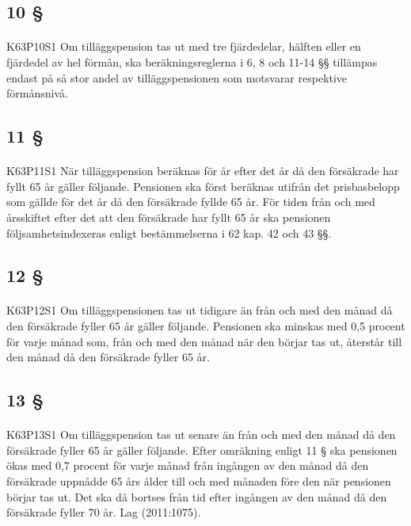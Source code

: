 \documentclass[a4paper,notitlepage,openany,10pt]{book}
\begin{document}
\subsection*{10 §}
\paragraph*{}
{\tiny K63P10S1}
Om tilläggspension tas ut med tre fjärdedelar, hälften eller en fjärdedel av hel förmån, ska beräkningsreglerna i 6, 8 och 11-14 §§ tillämpas endast på så stor andel av tilläggspensionen som motsvarar respektive förmånsnivå.
\subsection*{11 §}
\paragraph*{}
{\tiny K63P11S1}
När tilläggspension beräknas för år efter det år då den försäkrade har fyllt 65 år gäller följande. Pensionen ska först beräknas utifrån det prisbasbelopp som gällde för det år då den försäkrade fyllde 65 år. För tiden från och med årsskiftet efter det att den försäkrade har fyllt 65 år ska pensionen följsamhetsindexeras enligt bestämmelserna i 62 kap. 42 och 43 §§.
\subsection*{12 §}
\paragraph*{}
{\tiny K63P12S1}
Om tilläggspensionen tas ut tidigare än från och med den månad då den försäkrade fyller 65 år gäller följande.
Pensionen ska minskas med 0,5 procent för varje månad som, från och med den månad när den börjar tas ut, återstår till den månad då den försäkrade fyller 65 år.
\subsection*{13 §}
\paragraph*{}
{\tiny K63P13S1}
Om tilläggspension tas ut senare än från och med den månad då den försäkrade fyller 65 år gäller följande. Efter omräkning enligt 11 § ska pensionen ökas med 0,7 procent för varje månad från ingången av den månad då den försäkrade uppnådde 65 års ålder till och med månaden före den när pensionen börjar tas ut. Det ska då bortses från tid efter ingången av den månad då den försäkrade fyller 70 år.
Lag (2011:1075).
\end{document}
